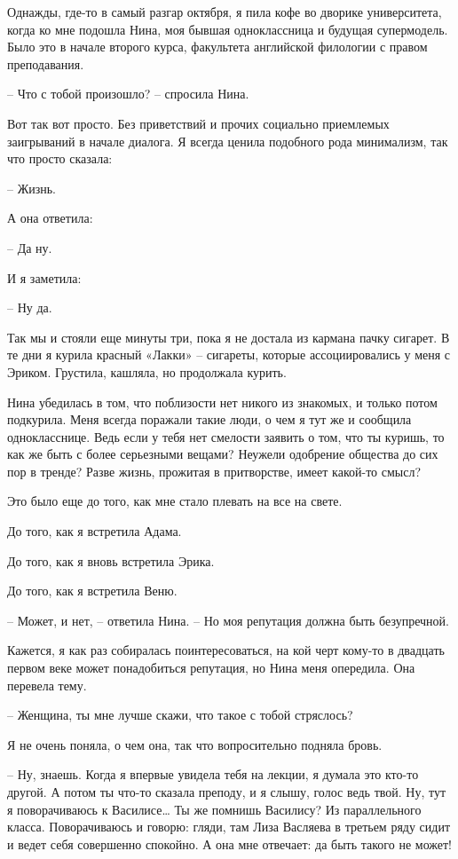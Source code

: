 \documentclass[
]{book}
\begin{document}
Однажды, где-то в самый разгар октября, я пила кофе во дворике университета, когда ко мне подошла Нина, моя бывшая одноклассница и будущая супермодель. Было это в начале второго курса, факультета английской филологии с правом преподавания.

-- Что с тобой произошло? -- спросила Нина.

Вот так вот просто. Без приветствий и прочих социально приемлемых заигрываний в начале диалога. Я всегда ценила подобного рода минимализм, так что просто сказала:

-- Жизнь.

А она ответила:

-- Да ну.

И я заметила:

-- Ну да.

Так мы и стояли еще минуты три, пока я не достала из кармана пачку сигарет. В те дни я курила красный «Лакки» -- сигареты, которые ассоциировались у меня с Эриком. Грустила, кашляла, но продолжала курить.

Нина убедилась в том, что поблизости нет никого из знакомых, и только потом подкурила. Меня всегда поражали такие люди, о чем я тут же и сообщила однокласснице. Ведь если у тебя нет смелости заявить о том, что ты куришь, то как же быть с более серьезными вещами? Неужели одобрение общества до сих пор в тренде? Разве жизнь, прожитая в притворстве, имеет какой-то смысл?

Это было еще до того, как мне стало плевать на все на свете.

До того, как я встретила Адама.

До того, как я вновь встретила Эрика.

До того, как я встретила Веню.

-- Может, и нет, -- ответила Нина. -- Но моя репутация должна быть безупречной.

Кажется, я как раз собиралась поинтересоваться, на кой черт кому-то в двадцать первом веке может понадобиться репутация, но Нина меня опередила. Она перевела тему.

-- Женщина, ты мне лучше скажи, что такое с тобой стряслось?

Я не очень поняла, о чем она, так что вопросительно подняла бровь.

-- Ну, знаешь. Когда я впервые увидела тебя на лекции, я думала это кто-то другой. А потом ты что-то сказала преподу, и я слышу, голос ведь твой. Ну, тут я поворачиваюсь к Василисе\ldots{} Ты же помнишь Василису? Из параллельного класса. Поворачиваюсь и говорю: гляди, там Лиза Васляева в третьем ряду сидит и ведет себя совершенно спокойно. А она мне отвечает: да быть такого не может!
\end{document}
